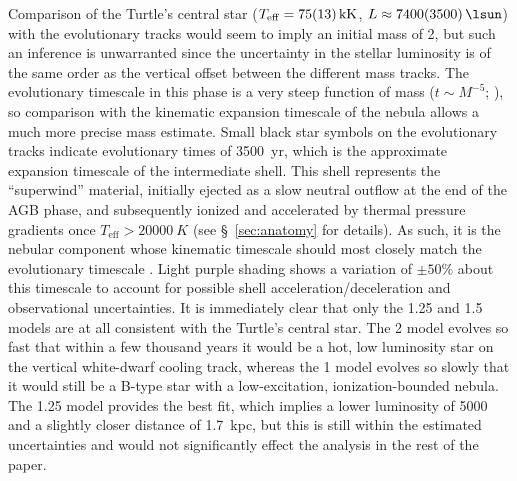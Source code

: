 \documentclass[useAMS, usenatbib]{mnras}
\newcommand{\teff}{\ensuremath{T_\mathrm{eff}}}
\begin{document}
Comparison of the Turtle's central star
(\(\teff = \SI{75 \pm 13}{kK}\), \(L \approx \SI{7400 \pm 3500}{\lsun}\))
with the evolutionary tracks would seem to imply an initial mass of \SI{2}{\msun},
but such an inference is unwarranted since the uncertainty in the stellar luminosity is of the same order as the vertical offset between the different mass tracks.
The evolutionary timescale in this phase is a very steep function of mass
(\(t \sim M^{-5}\); \citealp[Fig.~4]{Miller-Bertolami:2019a}), so comparison with the kinematic expansion timescale of the nebula allows a much more precise mass estimate.
Small black star symbols on the evolutionary tracks indicate evolutionary times of \SI{3500}{yr}, which is the approximate expansion timescale of the intermediate shell.
This shell represents the ``superwind'' material,
initially ejected as a slow neutral outflow at the end of the AGB phase,
and subsequently ionized and accelerated by thermal pressure gradients
once \(\teff > \SI{20000}{K}\) (see \S~\ref{sec:anatomy} for details).
As such, it is the nebular component whose kinematic timescale should most closely match the evolutionary timescale \citetext{see discussion in \S~2.3.4 of \citealp{Schonberner:2005a}}.
Light purple shading shows a variation of \(\pm 50\%\) about this timescale to account for possible shell acceleration/deceleration and observational uncertainties.
It is immediately clear that only the \num{1.25} and \SI{1.5}{\msun} models are at all consistent with the Turtle's central star.
The \SI{2}{\msun} model evolves so fast that within a few thousand years it would be a hot, low luminosity star on the vertical white-dwarf cooling track,
whereas the \SI{1}{\msun} model evolves so slowly that it would still be a B-type star with a low-excitation, ionization-bounded nebula. 
The \SI{1.25}{\msun} model provides the best fit,
which implies a lower luminosity of \SI{5000}{\lsun}
and a slightly closer distance of \SI{1.7}{kpc},
but this is still within the estimated uncertainties and would not significantly effect the analysis in the rest of the paper.
\end{document}
